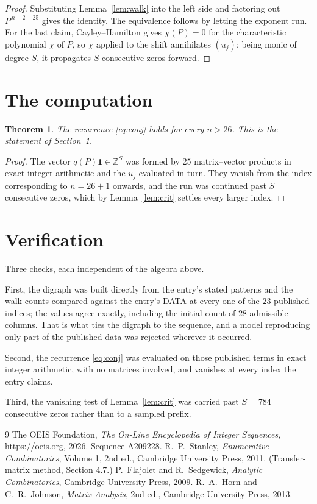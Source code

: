 \documentclass[11pt,a4paper]{article}
\theoremstyle{plain}
\newtheorem{theorem}{Theorem}
\theoremstyle{definition}
\begin{document}
\begin{proof}
Substituting Lemma~\ref{lem:walk} into the left side and factoring out
$P^{\,n-2-25}$ gives the identity. The equivalence follows by letting the exponent
run. For the last claim, Cayley--Hamilton gives $\chi(P)=0$ for the characteristic
polynomial $\chi$ of $P$, so $\chi$ applied to the shift annihilates $(u_j)$; being monic of
degree $S$, it propagates $S$ consecutive zeros forward.
\end{proof}

\section{The computation}

\begin{theorem}
The recurrence \eqref{eq:conj} holds for every $n>26$. This is the statement of
Section~1.
\end{theorem}

\begin{proof}
The vector $q(P)\mathbf{1}\in\mathbb{Z}^{S}$ was formed by $25$ matrix--vector
products in exact integer arithmetic and the $u_j$ evaluated in turn. They vanish from the
index corresponding to $n=26+1$ onwards, and the run was continued past $S$ consecutive
zeros, which by Lemma~\ref{lem:crit} settles every larger index.
\end{proof}

\section{Verification}

Three checks, each independent of the algebra above.

First, the digraph was built directly from the entry's stated patterns and the walk counts
compared against the entry's DATA at every one of the $23$ published indices; the
values agree exactly, including the initial count of $28$ admissible columns. That is
what ties the digraph to the sequence, and a model reproducing only part of the published
data was rejected wherever it occurred.

Second, the recurrence \eqref{eq:conj} was evaluated on those published terms in exact
integer arithmetic, with no matrices involved, and vanishes at every index the entry claims.

Third, the vanishing test of Lemma~\ref{lem:crit} was carried past $S=784$ consecutive
zeros rather than to a sampled prefix.

\begin{thebibliography}{9}
 The OEIS Foundation, \emph{The On-Line Encyclopedia of Integer
Sequences}, \url{https://oeis.org}, 2026. Sequence A209228.
 R.~P.~Stanley, \emph{Enumerative Combinatorics}, Volume 1, 2nd ed.,
Cambridge University Press, 2011. (Transfer-matrix method, Section 4.7.)
 P.~Flajolet and R.~Sedgewick, \emph{Analytic Combinatorics}, Cambridge
University Press, 2009.
 R.~A.~Horn and C.~R.~Johnson, \emph{Matrix Analysis}, 2nd ed., Cambridge
University Press, 2013.
\end{thebibliography}
\end{document}
